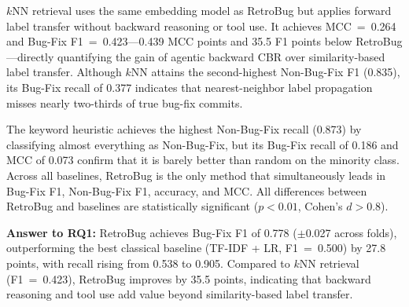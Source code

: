 $k$NN retrieval uses the same embedding model as RetroBug but applies
forward label transfer without backward reasoning or tool use.
It achieves MCC~=~0.264 and Bug-Fix F1~=~0.423---0.439 MCC points
and 35.5 F1 points below RetroBug---directly quantifying the gain of
agentic backward CBR over similarity-based label transfer.
Although $k$NN attains the second-highest Non-Bug-Fix F1 (0.835),
its Bug-Fix recall of 0.377 indicates that nearest-neighbor label
propagation misses nearly two-thirds of true bug-fix commits.

The keyword heuristic achieves the highest Non-Bug-Fix recall
(0.873) by classifying almost everything as Non-Bug-Fix, but its
Bug-Fix recall of 0.186 and MCC of 0.073 confirm that it is barely
better than random on the minority class.
Across all baselines, RetroBug is the only method that simultaneously
leads in Bug-Fix F1, Non-Bug-Fix F1, accuracy, and MCC.
All differences between RetroBug and baselines are statistically
significant ($p < 0.01$, Cohen's $d > 0.8$).



\begin{tcolorbox}[colback=gray!8, colframe=gray!50,
  boxrule=0.5pt, arc=2pt, left=4pt, right=4pt,
  top=3pt, bottom=3pt]
\textbf{Answer to RQ1:}
RetroBug achieves Bug-Fix F1 of 0.778 ($\pm$0.027 across folds),
outperforming the best classical baseline (TF-IDF + LR, F1~=~0.500)
by 27.8 points, with recall rising from 0.538 to 0.905.
Compared to $k$NN retrieval (F1~=~0.423), RetroBug improves by 35.5
points, indicating that backward reasoning and tool use add value
beyond similarity-based label transfer.
\end{tcolorbox}
